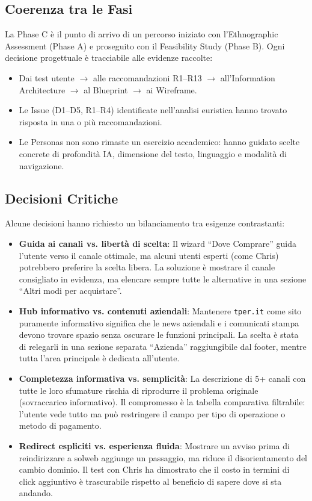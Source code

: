 \documentclass[11pt,a4paper]{article}
\begin{document}
\subsection{Coerenza tra le Fasi}

La Phase C \`e il punto di arrivo di un percorso iniziato con l'Ethnographic Assessment (Phase A) e proseguito con il Feasibility Study (Phase B). Ogni decisione progettuale \`e tracciabile alle evidenze raccolte:

\begin{itemize}
    \item Dai test utente $\rightarrow$ alle raccomandazioni R1--R13 $\rightarrow$ all'Information Architecture $\rightarrow$ al Blueprint $\rightarrow$ ai Wireframe.
    \item Le Issue (D1--D5, R1--R4) identificate nell'analisi euristica hanno trovato risposta in una o pi\`u raccomandazioni.
    \item Le Personas non sono rimaste un esercizio accademico: hanno guidato scelte concrete di profondit\`a IA, dimensione del testo, linguaggio e modalit\`a di navigazione.
\end{itemize}

\subsection{Decisioni Critiche}

Alcune decisioni hanno richiesto un bilanciamento tra esigenze contrastanti:

\begin{itemize}
    \item \textbf{Guida ai canali vs. libert\`a di scelta}: Il wizard ``Dove Comprare'' guida l'utente verso il canale ottimale, ma alcuni utenti esperti (come Chris) potrebbero preferire la scelta libera. La soluzione \`e mostrare il canale consigliato in evidenza, ma elencare sempre tutte le alternative in una sezione ``Altri modi per acquistare''.
    \item \textbf{Hub informativo vs. contenuti aziendali}: Mantenere \texttt{tper.it} come sito puramente informativo significa che le news aziendali e i comunicati stampa devono trovare spazio senza oscurare le funzioni principali. La scelta \`e stata di relegarli in una sezione separata ``Azienda'' raggiungibile dal footer, mentre tutta l'area principale \`e dedicata all'utente.
    \item \textbf{Completezza informativa vs. semplicit\`a}: La descrizione di 5+ canali con tutte le loro sfumature rischia di riprodurre il problema originale (sovraccarico informativo). Il compromesso \`e la tabella comparativa filtrabile: l'utente vede tutto ma pu\`o restringere il campo per tipo di operazione o metodo di pagamento.
    \item \textbf{Redirect espliciti vs. esperienza fluida}: Mostrare un avviso prima di reindirizzare a solweb aggiunge un passaggio, ma riduce il disorientamento del cambio dominio. Il test con Chris ha dimostrato che il costo in termini di click aggiuntivo \`e trascurabile rispetto al beneficio di sapere dove si sta andando.
\end{itemize}
\end{document}
